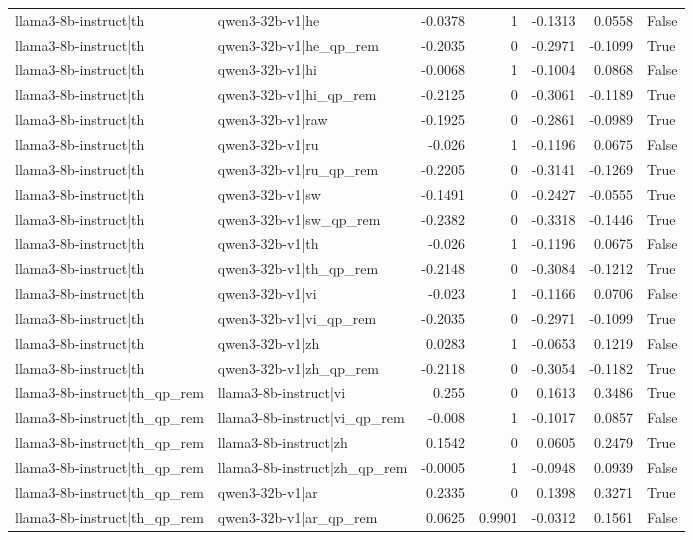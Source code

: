 \begin{table}
\begin{tabular}{l l r r r r l}
llama3-8b-instruct|th & qwen3-32b-v1|he & -0.0378 & 1 & -0.1313 & 0.0558 & False \\
llama3-8b-instruct|th & qwen3-32b-v1|he_qp_rem & -0.2035 & 0 & -0.2971 & -0.1099 & True \\
llama3-8b-instruct|th & qwen3-32b-v1|hi & -0.0068 & 1 & -0.1004 & 0.0868 & False \\
llama3-8b-instruct|th & qwen3-32b-v1|hi_qp_rem & -0.2125 & 0 & -0.3061 & -0.1189 & True \\
llama3-8b-instruct|th & qwen3-32b-v1|raw & -0.1925 & 0 & -0.2861 & -0.0989 & True \\
llama3-8b-instruct|th & qwen3-32b-v1|ru & -0.026 & 1 & -0.1196 & 0.0675 & False \\
llama3-8b-instruct|th & qwen3-32b-v1|ru_qp_rem & -0.2205 & 0 & -0.3141 & -0.1269 & True \\
llama3-8b-instruct|th & qwen3-32b-v1|sw & -0.1491 & 0 & -0.2427 & -0.0555 & True \\
llama3-8b-instruct|th & qwen3-32b-v1|sw_qp_rem & -0.2382 & 0 & -0.3318 & -0.1446 & True \\
llama3-8b-instruct|th & qwen3-32b-v1|th & -0.026 & 1 & -0.1196 & 0.0675 & False \\
llama3-8b-instruct|th & qwen3-32b-v1|th_qp_rem & -0.2148 & 0 & -0.3084 & -0.1212 & True \\
llama3-8b-instruct|th & qwen3-32b-v1|vi & -0.023 & 1 & -0.1166 & 0.0706 & False \\
llama3-8b-instruct|th & qwen3-32b-v1|vi_qp_rem & -0.2035 & 0 & -0.2971 & -0.1099 & True \\
llama3-8b-instruct|th & qwen3-32b-v1|zh & 0.0283 & 1 & -0.0653 & 0.1219 & False \\
llama3-8b-instruct|th & qwen3-32b-v1|zh_qp_rem & -0.2118 & 0 & -0.3054 & -0.1182 & True \\
llama3-8b-instruct|th_qp_rem & llama3-8b-instruct|vi & 0.255 & 0 & 0.1613 & 0.3486 & True \\
llama3-8b-instruct|th_qp_rem & llama3-8b-instruct|vi_qp_rem & -0.008 & 1 & -0.1017 & 0.0857 & False \\
llama3-8b-instruct|th_qp_rem & llama3-8b-instruct|zh & 0.1542 & 0 & 0.0605 & 0.2479 & True \\
llama3-8b-instruct|th_qp_rem & llama3-8b-instruct|zh_qp_rem & -0.0005 & 1 & -0.0948 & 0.0939 & False \\
llama3-8b-instruct|th_qp_rem & qwen3-32b-v1|ar & 0.2335 & 0 & 0.1398 & 0.3271 & True \\
llama3-8b-instruct|th_qp_rem & qwen3-32b-v1|ar_qp_rem & 0.0625 & 0.9901 & -0.0312 & 0.1561 & False \\

\end{tabular}
\end{table}
